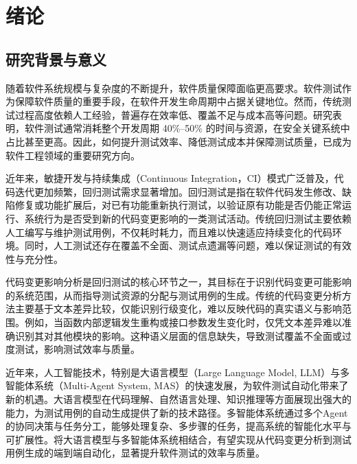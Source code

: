
\chapter{绪论}
\section{研究背景与意义}
随着软件系统规模与复杂度的不断提升，软件质量保障面临更高要求。软件测试作为保障软件质量的重要手段，在软件开发生命周期中占据关键地位。然而，传统测试过程高度依赖人工经验，普遍存在效率低、覆盖不足与成本高等问题。研究表明，软件测试通常消耗整个开发周期 40\%--50\% 的时间与资源\cite{Myers2011}，在安全关键系统中占比甚至更高。因此，如何提升测试效率、降低测试成本并保障测试质量，已成为软件工程领域的重要研究方向。

近年来，敏捷开发与持续集成（Continuous Integration，CI）模式广泛普及，代码迭代更加频繁，回归测试需求显著增加。回归测试是指在软件代码发生修改、缺陷修复或功能扩展后，对已有功能重新执行测试，以验证原有功能是否仍能正常运行、系统行为是否受到新的代码变更影响的一类测试活动。传统回归测试主要依赖人工编写与维护测试用例，不仅耗时耗力，而且难以快速适应持续变化的代码环境。同时，人工测试还存在覆盖不全面、测试点遗漏等问题，难以保证测试的有效性与充分性。

代码变更影响分析是回归测试的核心环节之一，其目标在于识别代码变更可能影响的系统范围，从而指导测试资源的分配与测试用例的生成。传统的代码变更分析方法主要基于文本差异比较，仅能识别行级变化，难以反映代码的真实语义与影响范围。例如，当函数内部逻辑发生重构或接口参数发生变化时，仅凭文本差异难以准确识别其对其他模块的影响。这种语义层面的信息缺失，导致测试覆盖不全面或过度测试，影响测试效率与质量。

近年来，人工智能技术，特别是大语言模型（Large Language Model, LLM）与多智能体系统（Multi-Agent System, MAS）的快速发展，为软件测试自动化带来了新的机遇。大语言模型在代码理解、自然语言处理、知识推理等方面展现出强大的能力，为测试用例的自动生成提供了新的技术路径。多智能体系统通过多个Agent的协同决策与任务分工，能够处理复杂、多步骤的任务，提高系统的智能化水平与可扩展性\cite{Wooldridge2002}。将大语言模型与多智能体系统相结合，有望实现从代码变更分析到测试用例生成的端到端自动化，显著提升软件测试的效率与质量。


